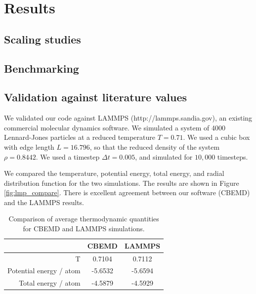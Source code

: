 \documentclass[12pt]{article}
\begin{document}
\section{Results}

\subsection{Scaling studies}

\subsection{Benchmarking}

\subsection{Validation against literature values}

We validated our code against LAMMPS \cite{plimpton1995fast} (http://lammps.sandia.gov), an existing commercial molecular dynamics software.
%
We simulated a system of 4000 Lennard-Jones particles at a reduced temperature $T=0.71$. 
%
We used a cubic box with edge length $L=16.796$, so that the reduced density of the system $\rho = 0.8442$. 
%
We used a timestep $\Delta t=0.005$, and simulated for $10,000$ timesteps.


We compared the temperature, potential energy, total energy, and radial distribution function for the two simulations. 
%
The results are shown in Figure \ref{fig:lmp_compare}. 
% 
There is excellent agreement between our software (CBEMD) and the LAMMPS results. 

\begin{table}
	\begin{tabular}{| r | c | c |}
		\hline
		 & CBEMD & LAMMPS \\
		 \hline
		 T & 0.7104 & 0.7112 \\
		 \hline
		 Potential energy / atom & -5.6532 & -5.6594 \\
		 \hline
		 Total energy / atom & -4.5879 & -4.5929 \\
		 \hline
	\end{tabular}
	\caption{Comparison of average thermodynamic quantities for CBEMD and LAMMPS simulations.}
	\label{table:lmp_compare}
\end{table}
		 
\end{document}
